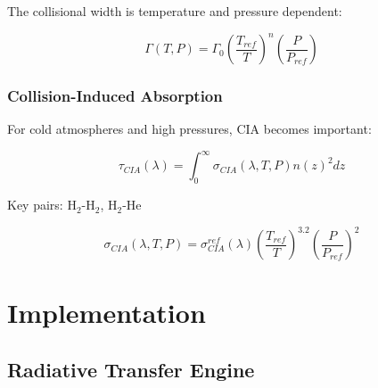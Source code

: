 \documentclass[12pt,a4paper,oneside]{report}
\begin{document}
The collisional width is temperature and pressure dependent:

\begin{equation}
\Gamma(T, P) = \Gamma_0 \left(\frac{T_{ref}}{T}\right)^n \left(\frac{P}{P_{ref}}\right)
\label{eq:collision_width}
\end{equation}

\subsubsection{Collision-Induced Absorption}

For cold atmospheres and high pressures, CIA becomes important:

\begin{equation}
\tau_{CIA}(\lambda) = \int_0^\infty \sigma_{CIA}(\lambda, T, P) n(z)^2 dz
\label{eq:tau_cia}
\end{equation}

Key pairs: H$_2$-H$_2$, H$_2$-He

\begin{equation}
\sigma_{CIA}(\lambda, T, P) = \sigma_{CIA}^{ref}(\lambda) \left(\frac{T_{ref}}{T}\right)^{3.2} \left(\frac{P}{P_{ref}}\right)^2
\label{eq:cia_cross}
\end{equation}

\section{Implementation}

\subsection{Radiative Transfer Engine}
\end{document}
